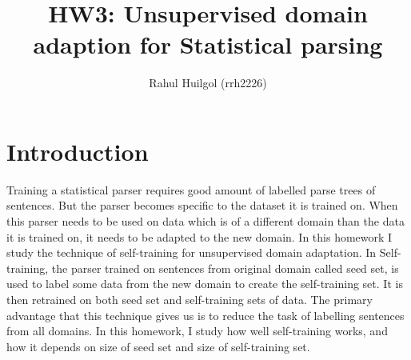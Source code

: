 \documentclass{article}
\begin{document}
\title{\vspace{-4ex}HW3: Unsupervised domain adaption for Statistical parsing}
\author{Rahul Huilgol (rrh2226)}
\date{}
\maketitle
\vspace{-10mm}
\section{Introduction}
Training a statistical parser requires good amount of labelled parse trees of sentences. But the parser becomes specific to the dataset it is trained on. When this parser needs to be used on data which is of a different domain than the data it is trained on, it needs to be adapted to the new domain. In this homework I study the technique of self-training for unsupervised domain adaptation. In Self-training, the parser trained on sentences from original domain called seed set, is used to label some data from the new domain to create the self-training set. It is then retrained on both seed set and self-training sets of data. The primary advantage that this technique gives us is to reduce the task of labelling sentences from all domains. In this homework, I study how well self-training works, and how it depends on size of seed set and size of self-training set.
\vspace{-2mm}
\end{document}
